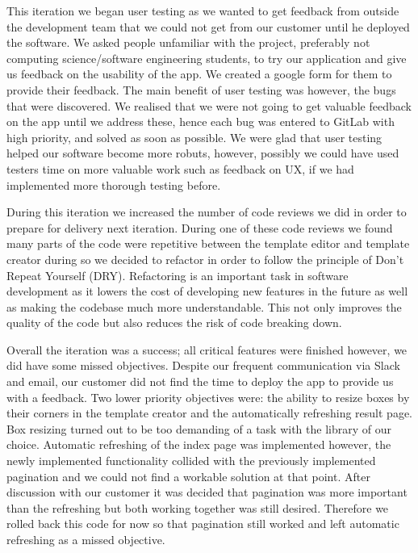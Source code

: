 \documentclass{l3proj}
\begin{document}
This iteration we began user testing as we wanted to get feedback from outside the development team that we could not get from our customer until he deployed the software. We asked people unfamiliar with the project, preferably not computing science/software engineering students, to try our application and give us feedback on the usability of the app. We created a google form for them to provide their feedback. The main benefit of user testing was however, the bugs that were discovered. We realised that we were not going to get valuable feedback on the app until we address these, hence each bug was entered to GitLab with high priority, and solved as soon as possible.
We were glad that user testing helped our software become more robuts, however, possibly we could have used testers time on more valuable work such as feedback on UX, if we had implemented more thorough testing before.

During this iteration we increased the number of code reviews we did in order to prepare for delivery next iteration. During one of these code reviews we found many parts of the code were repetitive between the template editor and template creator during so  we decided to refactor in order to follow the principle of Don’t Repeat Yourself (DRY). Refactoring is an important task in software development as it lowers the cost of developing new features in the future as well as making the codebase much more understandable. This not only improves the quality of the code but also reduces the risk of code breaking down.

Overall the iteration was a success; all critical features were finished however, we did have some missed objectives. Despite our frequent communication via Slack and email, our customer did not find the time to deploy the app to provide us with a feedback. Two lower priority objectives were: the ability to resize boxes by their corners in the template creator and the automatically refreshing result page. Box resizing turned out to be too demanding of a task with the library of our choice. Automatic refreshing of the index page was implemented however, the newly implemented functionality collided with the previously implemented pagination and we could not find a workable solution at that point. After discussion with our customer it was decided that pagination was more important than the refreshing but both working together was still desired. Therefore we rolled back this code for now so that pagination still worked and left automatic refreshing as a missed objective. 
\end{document}
